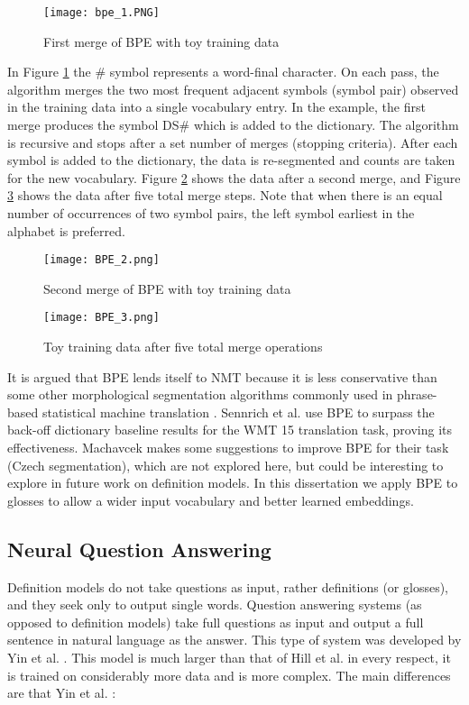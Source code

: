 \documentclass[11pt]{article}
\begin{document}
\begin{spacing}{1}
\begin{figure}[!htpb]
\texttt{[image: bpe\_1.PNG]}
\caption{First merge of BPE with toy training data}
\label{bpe_1}
\end{figure}

In Figure \ref{bpe_1} the \# symbol represents a word-final character. On each pass, the algorithm merges the two most frequent adjacent symbols (symbol pair) observed in the training data into a single vocabulary entry. In the example, the first merge produces the symbol DS\# which is added to the dictionary. The algorithm is recursive and stops after a set number of merges (stopping criteria). After each symbol is added to the dictionary, the data is re-segmented and counts are taken for the new vocabulary. Figure \ref{bpe_2} shows the data after a second merge, and Figure \ref{bpe_3} shows the data after five total merge steps. Note that when there is an equal number of occurrences of two symbol pairs, the left symbol earliest in the alphabet is preferred.

\begin{figure}[!htpb]
\texttt{[image: BPE\_2.png]}
\caption{Second merge of BPE with toy training data}
\label{bpe_2}
\end{figure}

\begin{figure}[!htpb]
\texttt{[image: BPE\_3.png]}
\caption{Toy training data after five total merge operations}
\label{bpe_3}
\end{figure}

It is argued that BPE lends itself to NMT because it is less conservative than some other morphological segmentation algorithms commonly used in phrase-based statistical machine translation \cite{sennrich2015neural}. Sennrich et al. use BPE to surpass the back-off dictionary baseline results for the WMT 15 translation task, proving its effectiveness. Machavcek \citeyear{machavcek2018morphological} makes some suggestions to improve BPE for their task (Czech segmentation), which are not explored here, but could be interesting to explore in future work on definition models. In this dissertation we apply BPE to glosses to allow a wider input vocabulary and better learned embeddings.

\subsection{Neural Question Answering}
Definition models do not take questions as input, rather definitions (or glosses), and they seek only to output single words. Question answering systems (as opposed to definition models) take full questions as input and output a full sentence in natural language as the answer. This type of system was developed by Yin et al. \citeyear{yin2015neural}. This model is much larger than that of Hill et al. \citeyear{hill2015learning} in every respect, it is trained on considerably more data and is more complex. The main differences are that Yin et al. \citeyear{yin2015neural}:


\end{spacing}
\end{document}
